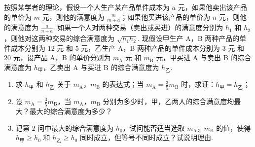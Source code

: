 \begin{problem}
按照某学者的理论，假设一个人生产某产品单件成本为 \(a\text{ 元}\)，如果他卖出该产品的单价为 \(m\text{ 元}\)，则他的满意度为 \(\frac{m}{m+a}\)；如果他买进该产品的单价为 \(n\text{ 元}\)，则他的满意度为 \(\frac{a}{n+a}\). 如果一个人对两种交易（卖出或买进）的满意度分别为 \(h_1\) 和 \(h_2\)，则他对这两种交易的综合满意度为 \(\sqrt{h_1h_2}\). 现假设甲生产 A，B 两种产品的单件成本分别为 \(12\text{ 元}\) 和 \(5\text{ 元}\)，乙生产 A，B 两种产品的单件成本分别为 \(3\text{ 元}\) 和 \(20\text{ 元}\)，设产品 A，B 的单价分别为 \(m_{\text{A}}\text{ 元}\) 和 \(m_{\text{B}}\text{ 元}\)，甲买进 A 与卖出 B 的综合满意度为 \(h_{\text{甲}}\)，乙卖出 A 与买进 B 的综合满意度为 \(h_{\text{乙}}\).

\begin{enumerate}
\item 求 \(h_{\text{甲}}\) 和 \(h_{\text{乙}}\) 关于 \(m_{\text{A}}\)，\(m_{\text{B}}\) 的表达式；当 \(m_{\text{A}}=\frac35m_{\text{B}}\) 时，求证：\(h_{\text{甲}}=h_{\text{乙}}\)；
\item 设 \(m_{\text{A}}=\frac35m_{\text{B}}\)，当 \(m_{\text{A}}\)，\(m_{\text{B}}\) 分别为多少时，甲，乙两人的综合满意度均最大？最大的综合满意度为多少？
\item 记第 \(2\) 问中最大的综合满意度为 \(h_0\)，试问能否适当选取 \(m_{\text{A}}\)，\(m_{\text{B}}\) 的值，使得 \(h_{\text{甲}}\ge h_0\) 和 \(h_{\text{乙}}\ge h_0\) 同时成立，但等号不同时成立？试说明理由.
\end{enumerate}
\end{problem}

